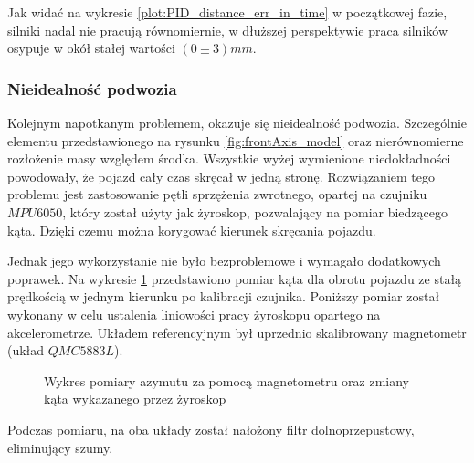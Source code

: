             Jak widać na wykresie \ref{plot:PID_distance_err_in_time} w początkowej fazie, silniki nadal nie pracują równomiernie, w dłuższej perspektywie praca silników osypuje w okół stałej wartości $(0 \pm 3)mm$.

    \subsubsection{Nieidealność podwozia}
        Kolejnym napotkanym problemem, okazuje się nieidealność podwozia.
        Szczególnie elementu przedstawionego na rysunku \ref{fig:frontAxis_model} oraz nierównomierne rozłożenie masy względem środka.
        Wszystkie wyżej wymienione niedokładności powodowały, że pojazd cały czas skręcał w jedną stronę.
        Rozwiązaniem tego problemu jest zastosowanie pętli sprzężenia zwrotnego, opartej na czujniku $MPU6050$, który został użyty jak żyroskop, pozwalający na pomiar biedzącego kąta.
        Dzięki czemu można korygować kierunek skręcania pojazdu.

        Jednak jego wykorzystanie nie było bezproblemowe i wymagało dodatkowych poprawek.
        Na wykresie \ref{plot:gyro_magneto_measure} przedstawiono pomiar kąta dla obrotu pojazdu ze stałą prędkością w jednym kierunku po kalibracji czujnika.
        Poniższy pomiar został wykonany w celu ustalenia liniowości pracy żyroskopu opartego na akcelerometrze.
        Układem referencyjnym był uprzednio skalibrowany magnetometr (układ $QMC5883L$).
%
        \begin{figure}[!ht]
            \centering
                \caption{Wykres pomiary azymutu za pomocą magnetometru oraz zmiany kąta wykazanego przez żyroskop}
                \label{plot:gyro_magneto_measure}
        \end{figure}
        Podczas pomiaru, na oba układy został nałożony filtr dolnoprzepustowy, eliminujący szumy.

